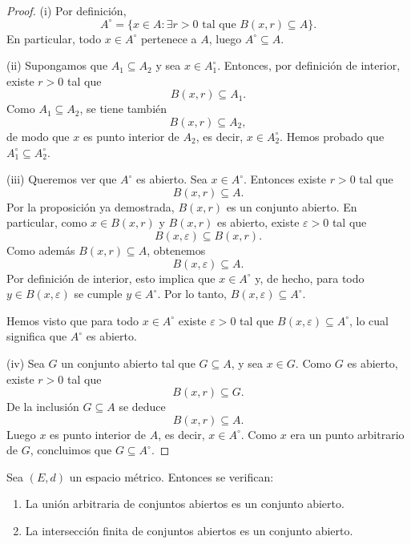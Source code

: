 \begin{proof}
(i) Por definición,
\[
A^\circ = \{x \in A : \exists r>0 \text{ tal que } B(x,r) \subseteq A\}.
\]
En particular, todo $x \in A^\circ$ pertenece a $A$, luego
$A^\circ \subseteq A$.

\medskip

(ii) Supongamos que $A_1 \subseteq A_2$ y sea $x \in A_1^\circ$.
Entonces, por definición de interior, existe $r>0$ tal que
\[
B(x,r) \subseteq A_1.
\]
Como $A_1 \subseteq A_2$, se tiene también
\[
B(x,r) \subseteq A_2,
\]
de modo que $x$ es punto interior de $A_2$, es decir, $x \in A_2^\circ$.
Hemos probado que $A_1^\circ \subseteq A_2^\circ$.

\medskip

(iii) Queremos ver que $A^\circ$ es abierto. Sea $x \in A^\circ$.
Entonces existe $r>0$ tal que
\[
B(x,r) \subseteq A.
\]
Por la proposición ya demostrada, $B(x,r)$ es un conjunto abierto.
En particular, como $x \in B(x,r)$ y $B(x,r)$ es abierto, existe
$\varepsilon>0$ tal que
\[
B(x,\varepsilon) \subseteq B(x,r).
\]
Como además $B(x,r) \subseteq A$, obtenemos
\[
B(x,\varepsilon) \subseteq A.
\]
Por definición de interior, esto implica que $x \in A^\circ$ y, de hecho,
para todo $y \in B(x,\varepsilon)$ se cumple $y \in A^\circ$.
Por lo tanto, $B(x,\varepsilon) \subseteq A^\circ$.

Hemos visto que para todo $x \in A^\circ$ existe $\varepsilon>0$ tal que
$B(x,\varepsilon) \subseteq A^\circ$, lo cual significa que $A^\circ$
es abierto.

\medskip

(iv) Sea $G$ un conjunto abierto tal que $G \subseteq A$, y sea
$x \in G$. Como $G$ es abierto, existe $r>0$ tal que
\[
B(x,r) \subseteq G.
\]
De la inclusión $G \subseteq A$ se deduce
\[
B(x,r) \subseteq A.
\]
Luego $x$ es punto interior de $A$, es decir, $x \in A^\circ$.
Como $x$ era un punto arbitrario de $G$, concluimos que $G \subseteq A^\circ$.
\end{proof}

\begin{prop}
Sea $(E,d)$ un espacio métrico. Entonces se verifican:
\begin{enumerate}[label=(\roman*)]
    \item La unión arbitraria de conjuntos abiertos es un conjunto abierto.
    \item La intersección finita de conjuntos abiertos es un conjunto abierto.
\end{enumerate}
\end{prop}

